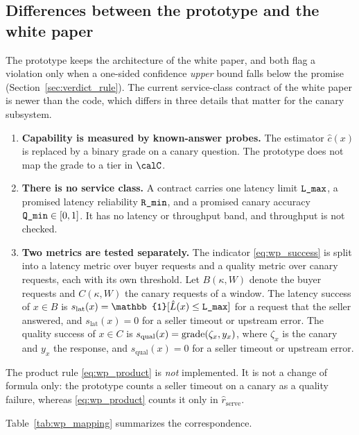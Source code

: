 \subsection{Differences between the prototype and the white paper}
\label{sec:background_refinements}

The prototype keeps the architecture of the white paper, and both flag a
violation only when a one-sided confidence \emph{upper} bound falls below the
promise (Section~\ref{sec:verdict_rule}). The current service-class contract of
the white paper is newer than the code, which differs in three details that
matter for the canary subsystem.

\begin{enumerate}
  \item \textbf{Capability is measured by known-answer probes.} The estimator
    $\hat c(x)$ is replaced by a binary grade on a canary question. The
    prototype does not map the grade to a tier in $\calC$.
  \item \textbf{There is no service class.} A contract carries one latency
    limit $\textnormal{\texttt{L\_max}}$, a promised latency reliability $\textnormal{\texttt{R\_min}}$, and a
    promised canary accuracy $\textnormal{\texttt{Q\_min}} \in [0,1]$. It has no latency or
    throughput band, and throughput is not checked.
  \item \textbf{Two metrics are tested separately.} The indicator
    \eqref{eq:wp_success} is split into a latency metric over buyer requests
    and a quality metric over canary requests, each with its own threshold. Let
    $B(\kappa,W)$ denote the buyer requests and $C(\kappa,W)$ the canary
    requests of a window. The latency success of $x \in B$ is
    $s_{\text{lat}}(x) = \mathbb{1}[\hat L(x) \leq \lmaxattr]$ for a request
    that the seller answered, and $s_{\text{lat}}(x) = 0$ for a seller timeout
    or upstream error. The quality success of $x \in C$ is
    $s_{\text{qual}}(x) = \mathrm{grade}(\zeta_x, y_x)$, where $\zeta_x$ is the canary
    and $y_x$ the response, and $s_{\text{qual}}(x) = 0$ for a seller timeout
    or upstream error.
\end{enumerate}

The product rule \eqref{eq:wp_product} is \emph{not} implemented. It is not a
change of formula only: the prototype counts a seller timeout on a canary as a
quality failure, whereas \eqref{eq:wp_product} counts it only in
$\hat r_{\text{serve}}$.

Table~\ref{tab:wp_mapping} summarizes the correspondence.

